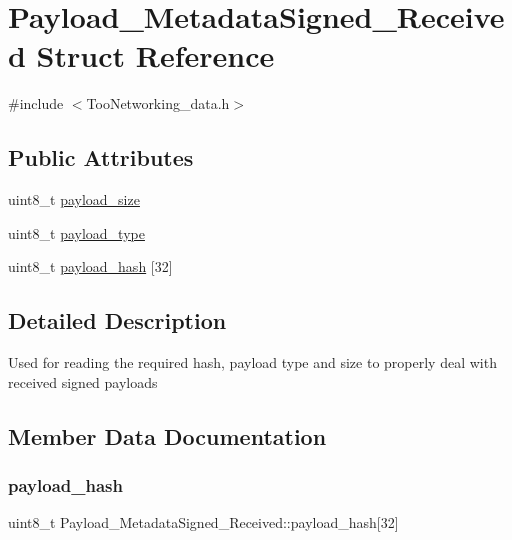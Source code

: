\hypertarget{structPayload__MetadataSigned__Received}{}\section{Payload\+\_\+\+Metadata\+Signed\+\_\+\+Received Struct Reference}
\label{structPayload__MetadataSigned__Received}


{\ttfamily \#include $<$Too\+Networking\+\_\+data.\+h$>$}

\subsection*{Public Attributes}
\begin{DoxyCompactItemize}
\item 
uint8\+\_\+t \hyperlink{structPayload__MetadataSigned__Received_a3d2d5a1f14940bbc0435dc1fec8fb238}{payload\+\_\+size}
\item 
uint8\+\_\+t \hyperlink{structPayload__MetadataSigned__Received_aad832d1e40428c42d4cac30012eacc02}{payload\+\_\+type}
\item 
uint8\+\_\+t \hyperlink{structPayload__MetadataSigned__Received_a6c37ad37ff363c7480fa99836fbdc0c5}{payload\+\_\+hash} \mbox{[}32\mbox{]}
\end{DoxyCompactItemize}


\subsection{Detailed Description}
Used for reading the required hash, payload type and size to properly deal with received signed payloads 

\subsection{Member Data Documentation}
\mbox{\label{structPayload__MetadataSigned__Received_a6c37ad37ff363c7480fa99836fbdc0c5}} 
\subsubsection{\texorpdfstring{payload\+\_\+hash}{payload\_hash}}
{\footnotesize\ttfamily uint8\+\_\+t Payload\+\_\+\+Metadata\+Signed\+\_\+\+Received\+::payload\+\_\+hash\mbox{[}32\mbox{]}}

